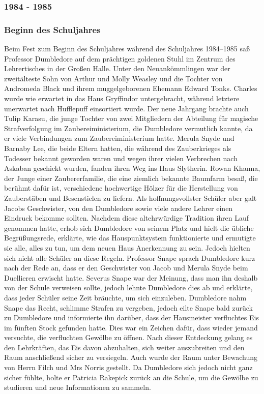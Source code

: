 \documentclass[a4paper, 10pt]{article}
\begin{document}
\subsubsection*{1984 - 1985}
\subsubsection*{Beginn des Schuljahres}
Beim Fest zum Beginn des Schuljahres während des Schuljahres 1984–1985 saß Professor Dumbledore auf dem prächtigen goldenen Stuhl im Zentrum des Lehrertisches in der Großen Halle. Unter den Neuankömmlingen war der zweitälteste Sohn von Arthur und Molly Weasley und die Tochter von Andromeda Black und ihrem muggelgeborenen Ehemann Edward Tonks. Charles wurde wie erwartet in das Haus Gryffindor untergebracht, während letztere unerwartet nach Hufflepuff einsortiert wurde. Der neue Jahrgang brachte auch Tulip Karasu, die junge Tochter von zwei Mitgliedern der Abteilung für magische Strafverfolgung im Zaubereiministerium, die Dumbledore vermutlich kannte, da er viele Verbindungen zum Zaubereiministerium hatte. Merula Snyde und Barnaby Lee, die beide Eltern hatten, die während des Zauberkrieges als Todesser bekannt geworden waren und wegen ihrer vielen Verbrechen nach Askaban geschickt wurden, fanden ihren Weg ins Haus Slytherin. Rowan Khanna, der Junge einer Zaubererfamilie, die eine ziemlich bekannte Baumfarm besaß, die berühmt dafür ist, verschiedene hochwertige Hölzer für die Herstellung von Zauberstäben und Besenstielen zu liefern. Als hoffnungsvollster Schüler aber galt Jacobs Geschwister, von den Dumbledore sowie viele andere Lehrer einen Eindruck bekomme sollten.
\vspace{10pt}
\newline
Nachdem diese altehrwürdige Tradition ihren Lauf genommen hatte, erhob sich Dumbledore von seinem Platz und hielt die übliche Begrüßungsrede, erklärte, wie das Hauspunktsystem funktionierte und ermutigte sie alle, alles zu tun, um dem neuen Haus Anerkennung zu sein. Jedoch hielten sich nicht alle Schüler an diese Regeln. Professor Snape sprach Dumbledore kurz nach der Rede an, dass er den Geschwister von Jacob und Merula Snyde beim Duellieren erwischt hatte. Severus Snape war der Meinung, dass man ihn deshalb von der Schule verweisen sollte, jedoch lehnte Dumbledore dies ab und erklärte, dass jeder Schüler seine Zeit bräuchte, um sich einzuleben. Dumbledore nahm Snape das Recht, schlimme Strafen zu vergeben, jedoch eilte Snape bald zurück zu Dumbledore und informierte ihn darüber, dass der Hausmeister verfluchtes Eis im fünften Stock gefunden hatte. Dies war ein Zeichen dafür, dass wieder jemand versuchte, die verfluchten Gewölbe zu öffnen.
\vspace{10pt}
\newline
Nach dieser Entdeckung gelang es den Lehrkräften, das Eis davon abzuhalten, sich weiter auszubreiten und den Raum anschließend sicher zu versiegeln. Auch wurde der Raum unter Bewachung von Herrn Filch und Mrs Norris gestellt. Da Dumbledore
sich jedoch nicht ganz sicher fühlte, holte er Patricia Rakepick zurück an die Schule, um die Gewölbe zu studieren und neue Informationen zu sammeln.
\end{document}
